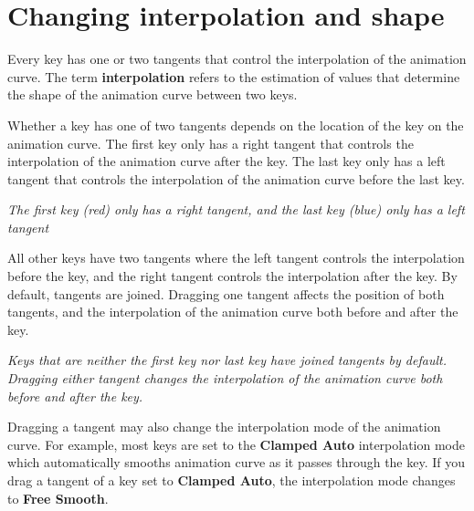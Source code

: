 \chapter{Changing interpolation and shape}
\hypertarget{md__hey_tea_9_2_library_2_package_cache_2com_8unity_8timeline_0d1_87_85_2_documentation_0i_2crv__keys__interp}{}\label{md__hey_tea_9_2_library_2_package_cache_2com_8unity_8timeline_0d1_87_85_2_documentation_0i_2crv__keys__interp}
\label{md__hey_tea_9_2_library_2_package_cache_2com_8unity_8timeline_0d1_87_85_2_documentation_0i_2crv__keys__interp_autotoc_md4639}%
%
 Every key has one or two tangents that control the interpolation of the animation curve. The term {\bfseries{interpolation}} refers to the estimation of values that determine the shape of the animation curve between two keys.

Whether a key has one of two tangents depends on the location of the key on the animation curve. The first key only has a right tangent that controls the interpolation of the animation curve after the key. The last key only has a left tangent that controls the interpolation of the animation curve before the last key.



{\itshape The first key (red) only has a right tangent, and the last key (blue) only has a left tangent}

All other keys have two tangents where the left tangent controls the interpolation before the key, and the right tangent controls the interpolation after the key. By default, tangents are joined. Dragging one tangent affects the position of both tangents, and the interpolation of the animation curve both before and after the key.



{\itshape Keys that are neither the first key nor last key have joined tangents by default. Dragging either tangent changes the interpolation of the animation curve both before and after the key.}

Dragging a tangent may also change the interpolation mode of the animation curve. For example, most keys are set to the {\bfseries{Clamped Auto}} interpolation mode which automatically smooths animation curve as it passes through the key. If you drag a tangent of a key set to {\bfseries{Clamped Auto}}, the interpolation mode changes to {\bfseries{Free Smooth}}.

